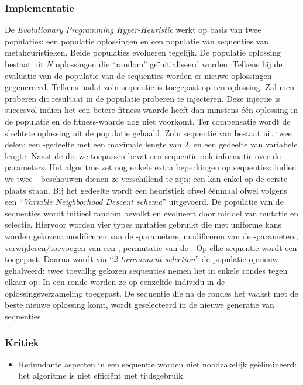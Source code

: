 \subsubsection{Implementatie}
De \emph{Evolutionary Programming Hyper-Heuristic}\cite{chesc-eph} werkt op basis van twee populaties: een populatie oplossingen en een populatie van sequenties van metaheuristieken. Beide populaties evolueren tegelijk. De populatie oplossing bestaat uit $N$ oplossingen die ``random'' ge\"initialiseerd worden. Telkens bij de evaluatie van de populatie van de sequenties worden er nieuwe oplossingen gegenereerd. Telkens nadat zo'n sequentie is toegepast op een oplossing. Zal men proberen dit resultaat in de populatie proberen te injecteren. Deze injectie is succesvol indien het een betere fitness waarde heeft dan minstens \'e\'en oplossing in de populatie en de fitness-waarde nog niet voorkomt. Ter compensatie wordt de slechtste oplossing uit de populatie gehaald. Zo'n sequentie van \abllhn{} bestaat uit twee delen: een \abpt{}-gedeelte met een maximale lengte van 2, en een \abls{} gedeelte van variabele lengte. Naast de \abllhn{} die we toepassen bevat een sequentie ook informatie over de parameters. Het algoritme zet nog enkele extra beperkingen op sequenties: indien we twee \abpt{}-\abhn{} beschouwen dienen ze verschillend te zijn; een \abpt{} \abh{} kan enkel op de eerste plaats staan. Bij het \abls{} gedeelte wordt een heuristiek ofwel \'e\'enmaal ofwel volgens een ``\emph{Variable Neighborhood Descent schema}''\cite{hom/vns} uitgevoerd. De populatie van de sequenties wordt initieel random bevolkt en evolueert door middel van mutatie en selectie. Hiervoor worden vier types mutaties gebruikt die met uniforme kans worden gekozen: modificeren van de \abpt{}-parameters, modificeren van de \abls{}-parameters, verwijderen/toevoegen van een \abpt{}, permutatie van de \abls{} \abhn{}. Op elke sequentie wordt een \abmt{} toegepast. Daarna wordt via ``\emph{2-tournament selection}''\cite{Miller95geneticalgorithms} de populatie opnieuw gehalveerd: twee toevallig gekozen sequenties nemen het in enkele rondes tegen elkaar op. In een ronde worden ze op eenzelfde individu in de oplossingsverzameling toegepast. De sequentie die na de rondes het vaakst met de beste nieuwe oplossing komt, wordt geselecteerd in de nieuwe generatie van sequenties.
\subsubsection{Kritiek}
\begin{itemize}
 \item Redundante aspecten in een sequentie worden niet noodzakelijk ge\"elimineerd: het algoritme is niet effici\"ent met tijdsgebruik.
\end{itemize}

